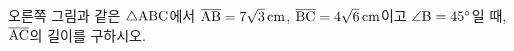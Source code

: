 \noindent\begin{minipage}[t]{0.58\linewidth}\vspace{0pt}\raggedright 오른쪽 그림과 같은 $\triangle\mathrm{ABC}$에서 $\overline{\mathrm{AB}}=7\sqrt{3}\,\mathrm{cm}$, $\overline{\mathrm{BC}}=4\sqrt{6}\,\mathrm{cm}$이고 $\angle\mathrm{B}=45^\circ$일 때, $\overline{\mathrm{AC}}$의 길이를 구하시오.\end{minipage}\hfill\begin{minipage}[t]{0.4\linewidth}\vspace{0pt}\centering \resizebox{\ifdim\width>\linewidth\linewidth\else\width\fi}{!}{}\end{minipage}\par
